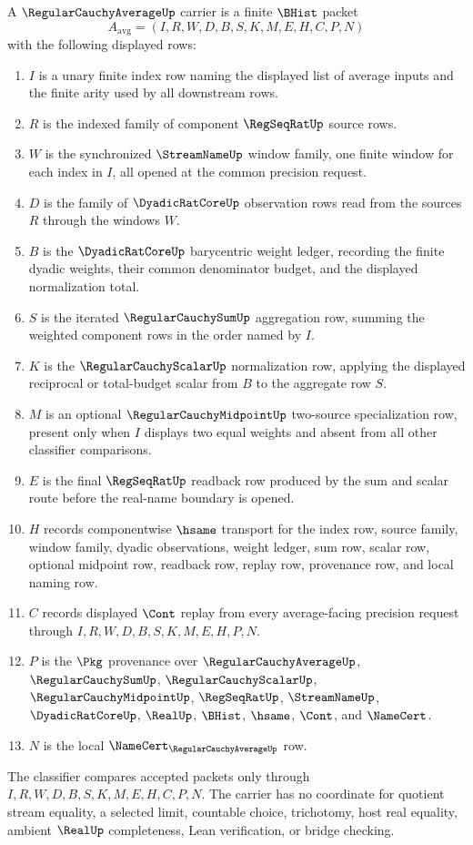 \begin{definition}
\label{def:regular-cauchy-average-carrier}
A $\RegularCauchyAverageUp$ carrier is a finite $\BHist$ packet
$$
A_{\mathrm{avg}}=(I,R,W,D,B,S,K,M,E,H,C,P,N)
$$
with the following displayed rows:
\begin{enumerate}
\item $I$ is a unary finite index row naming the displayed list of average inputs and the finite arity used by all downstream rows.
\item $R$ is the indexed family of component $\RegSeqRatUp$ source rows.
\item $W$ is the synchronized $\StreamNameUp$ window family, one finite window for each index in $I$, all opened at the common precision request.
\item $D$ is the family of $\DyadicRatCoreUp$ observation rows read from the sources $R$ through the windows $W$.
\item $B$ is the $\DyadicRatCoreUp$ barycentric weight ledger, recording the finite dyadic weights, their common denominator budget, and the displayed normalization total.
\item $S$ is the iterated $\RegularCauchySumUp$ aggregation row, summing the weighted component rows in the order named by $I$.
\item $K$ is the $\RegularCauchyScalarUp$ normalization row, applying the displayed reciprocal or total-budget scalar from $B$ to the aggregate row $S$.
\item $M$ is an optional $\RegularCauchyMidpointUp$ two-source specialization row, present only when $I$ displays two equal weights and absent from all other classifier comparisons.
\item $E$ is the final $\RegSeqRatUp$ readback row produced by the sum and scalar route before the real-name boundary is opened.
\item $H$ records componentwise $\hsame$ transport for the index row, source family, window family, dyadic observations, weight ledger, sum row, scalar row, optional midpoint row, readback row, replay row, provenance row, and local naming row.
\item $C$ records displayed $\Cont$ replay from every average-facing precision request through $I,R,W,D,B,S,K,M,E,H,P,N$.
\item $P$ is the $\Pkg$ provenance over $\RegularCauchyAverageUp$, $\RegularCauchySumUp$, $\RegularCauchyScalarUp$, $\RegularCauchyMidpointUp$, $\RegSeqRatUp$, $\StreamNameUp$, $\DyadicRatCoreUp$, $\RealUp$, $\BHist$, $\hsame$, $\Cont$, and $\NameCert$.
\item $N$ is the local $\NameCert_{\RegularCauchyAverageUp}$ row.
\end{enumerate}
The classifier compares accepted packets only through $I,R,W,D,B,S,K,M,E,H,C,P,N$. The carrier has no coordinate for quotient stream equality, a selected limit, countable choice, trichotomy, host real equality, ambient $\RealUp$ completeness, Lean verification, or bridge checking.
\end{definition}

